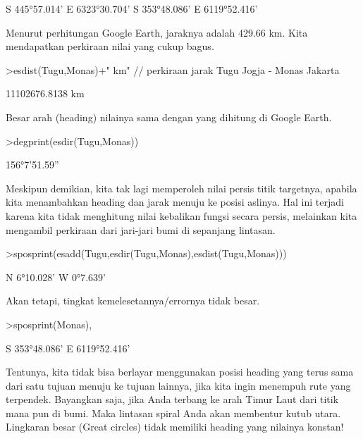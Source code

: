 \documentclass[a4paper,11pt,oneside,enabledeprecatedfontcommands]{scrbook}
\newenvironment{eulernotebook}{}{}
\newenvironment{eulercomment}{\par\medskip\noindent}{\par\medskip}
\begin{document}
\begin{eulernotebook}
\begin{eulerprompt}
\end{eulerprompt}
\begin{euleroutput}
S 445°57.014' E 6323°30.704'
S 353°48.086' E 6119°52.416'
\end{euleroutput}
\begin{eulercomment}
Menurut perhitungan Google Earth, jaraknya adalah 429.66 km. Kita mendapatkan
perkiraan nilai yang cukup bagus.
\end{eulercomment}
\begin{eulerprompt}
>esdist(Tugu,Monas)+" km" // perkiraan jarak Tugu Jogja - Monas Jakarta
\end{eulerprompt}
\begin{euleroutput}
11102676.8138 km
\end{euleroutput}
\begin{eulercomment}
Besar arah (heading) nilainya sama dengan yang dihitung di Google Earth.
\end{eulercomment}
\begin{eulerprompt}
>degprint(esdir(Tugu,Monas))
\end{eulerprompt}
\begin{euleroutput}
156°7'51.59''
\end{euleroutput}
\begin{eulercomment}
Meskipun demikian, kita tak lagi memperoleh nilai persis titik targetnya, apabila kita menambahkan
heading dan jarak menuju ke posisi aslinya. Hal ini terjadi karena kita
tidak menghitung nilai kebalikan fungsi secara persis, melainkan kita mengambil
perkiraan dari jari-jari bumi di sepanjang lintasan.
\end{eulercomment}
\begin{eulerprompt}
>sposprint(esadd(Tugu,esdir(Tugu,Monas),esdist(Tugu,Monas)))
\end{eulerprompt}
\begin{euleroutput}
N 6°10.028' W 0°7.639'
\end{euleroutput}
\begin{eulercomment}
Akan tetapi, tingkat kemelesetannya/errornya tidak besar.
\end{eulercomment}
\begin{eulerprompt}
>sposprint(Monas),
\end{eulerprompt}
\begin{euleroutput}
S 353°48.086' E 6119°52.416'
\end{euleroutput}
\begin{eulercomment}
Tentunya, kita tidak bisa berlayar menggunakan posisi heading yang terus sama dari satu tujuan
menuju ke tujuan lainnya, jika kita ingin menempuh rute yang terpendek. Bayangkan saja, jika Anda terbang ke arah Timur Laut
dari titik mana pun di bumi. Maka lintasan spiral Anda akan membentur kutub
utara. Lingkaran besar (Great circles) tidak memiliki heading yang nilainya konstan!


\end{eulercomment}
\end{eulernotebook}
\end{document}
